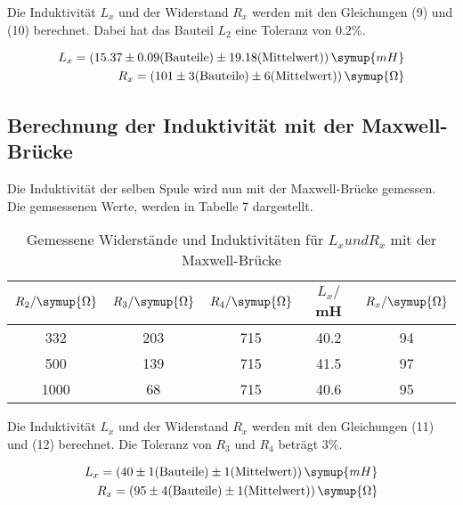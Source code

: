 Die Induktivität $L_{x}$ und der Widerstand $R_{x}$ werden mit den Gleichungen (9) und (10) berechnet. Dabei hat
das Bauteil $L_2$ eine Toleranz von $0.2\%$.

\begin{align*}
  L_{x} = (15.37 \pm 0.09\text{(Bauteile)} \pm 19.18\text{(Mittelwert)}) \, \symup{mH} \\
  R_x = (101 \pm 3\text{(Bauteile)} \pm 6\text{(Mittelwert)}) \, \symup{\Omega}
\end{align*}


\subsection{Berechnung der Induktivität mit der Maxwell-Brücke}
Die Induktivität der selben Spule wird nun mit der Maxwell-Brücke gemessen. Die gemsessenen Werte, werden in Tabelle 7
dargestellt.

\begin{table}[H]
  \centering
  \caption{Gemessene Widerstände und Induktivitäten für $L_{x} und R_{x}$ mit der Maxwell-Brücke}
  \label{tab:Widerstand}
  \begin{tabular}{c c c c c}
    \toprule
     $R_2/ \symup{\Omega}$ & $R_3/ \symup{\Omega}$ & $R_4 / \symup{\Omega}$ & $L_x/$mH & $R_x/\symup{\Omega}$\\
    \midrule
    332 & 203 & 715 & 40.2 & 94 \\
    500 & 139 & 715 & 41.5 & 97 \\
   1000 &  68 & 715 & 40.6 & 95 \\
    \bottomrule
  \end{tabular}
\end{table}

Die Induktivität $L_{x}$ und der Widerstand $R_{x}$ werden mit den Gleichungen (11) und (12) berechnet. Die
Toleranz von $R_3$ und $R_4$ beträgt $3\%$.

\begin{align*}
  L_x = (40 \pm 1\text{(Bauteile)} \pm 1 \text{(Mittelwert)})  \, \symup{mH} \\
  R_x = (95 \pm 4\text{(Bauteile)} \pm 1\text{(Mittelwert)})   \, \symup{\Omega}
\end{align*}











